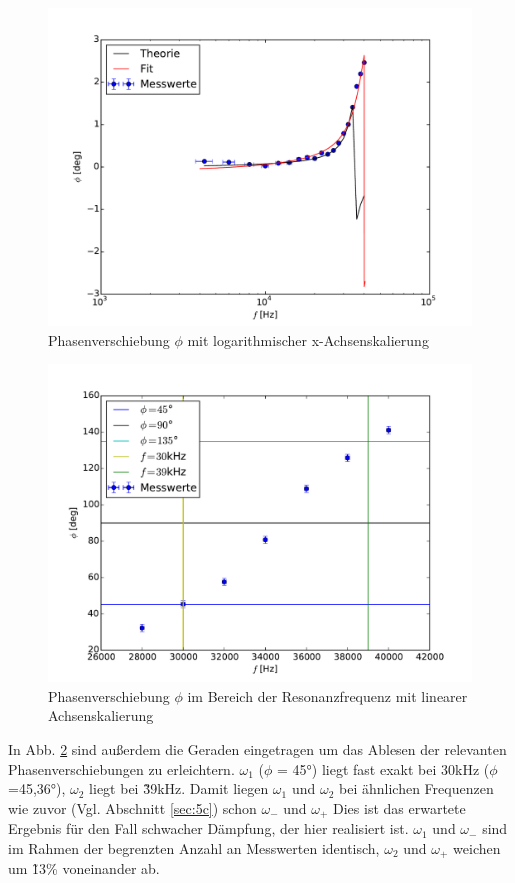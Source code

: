 \begin{figure}
  \centering
  \includegraphics[width=\textwidth]{5d.pdf}
  \caption{Phasenverschiebung $\phi$ mit logarithmischer x-Achsenskalierung}
  \label{fig:5dlog}
\end{figure}

\begin{figure}
  \centering
  \includegraphics[width=\textwidth]{5d2.pdf}
  \caption{Phasenverschiebung $\phi$ im Bereich der Resonanzfrequenz mit
  linearer Achsenskalierung}
  \label{fig:5dlin}
\end{figure}

In Abb. \ref{fig:5dlin} sind außerdem die Geraden eingetragen um das Ablesen
der relevanten Phasenverschiebungen zu erleichtern.
$\omega_1$ ($\phi$ = 45°) liegt fast exakt bei 30kHz ($\phi$=45,36°),
$\omega_2$ liegt bei \~ 39kHz. Damit liegen $\omega_1$ und $\omega_2$ bei
ähnlichen Frequenzen wie zuvor (Vgl. Abschnitt \ref{sec:5c}) schon $\omega_-$
und $\omega_+$ Dies ist das erwartete Ergebnis für den Fall schwacher
Dämpfung, der hier realisiert ist. $\omega_1$ und $\omega_-$ sind im Rahmen
der begrenzten Anzahl an Messwerten identisch, $\omega_2$ und $\omega_+$ weichen
um \~13\% voneinander ab.

